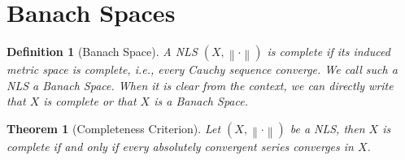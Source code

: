 \documentclass{article}
\newtheorem*{theorem}{Theorem}
\newtheorem*{definition}{Definition}
\newcommand{\norm}[1]{\left\lVert#1 \right\rVert}
\begin{document}
\section{Banach Spaces}

\begin{definition}[Banach Space]
    A NLS $(X, \norm{\cdot})$ is complete if its induced metric space is complete, i.e., every Cauchy sequence converge. We call such a NLS a Banach Space. When it is clear from the context, we can directly write that $X$ is complete or that $X$ is a Banach Space.
\end{definition}

\begin{theorem}[Completeness Criterion]
    Let $(X, \norm{\cdot})$ be a NLS, then $X$ is complete if and only if every absolutely convergent series converges in $X$.
\end{theorem}
\end{document}
